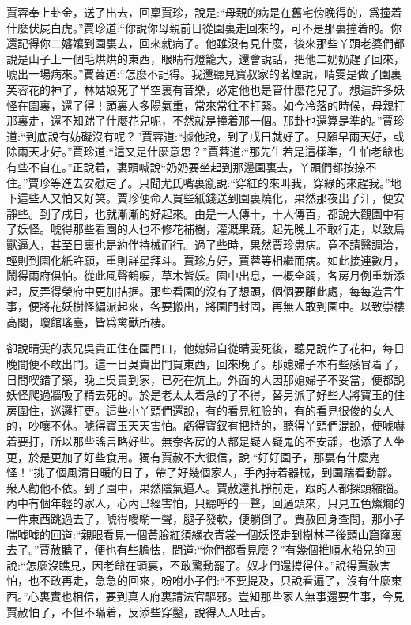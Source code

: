 \begin{parag}
    賈蓉奉上卦金，送了出去，回稟賈珍，說是:“母親的病是在舊宅傍晚得的，爲撞着什麼伏屍白虎。”賈珍道:“你說你母親前日從園裏走回來的，可不是那裏撞着的。你還記得你二嬸孃到園裏去，回來就病了。他雖沒有見什麼，後來那些丫頭老婆們都說是山子上一個毛烘烘的東西，眼睛有燈籠大，還會說話，把他二奶奶趕了回來，唬出一場病來。”賈蓉道:“怎麼不記得。我還聽見寶叔家的茗煙說，晴雯是做了園裏芙蓉花的神了，林姑娘死了半空裏有音樂，必定他也是管什麼花兒了。想這許多妖怪在園裏，還了得！頭裏人多陽氣重，常來常往不打緊。如今冷落的時候，母親打那裏走，還不知踹了什麼花兒呢，不然就是撞着那一個。那卦也還算是準的。”賈珍道:“到底說有妨礙沒有呢？”賈蓉道:“據他說，到了戌日就好了。只願早兩天好，或除兩天才好。”賈珍道:“這又是什麼意思？”賈蓉道:“那先生若是這樣準，生怕老爺也有些不自在。”正說着，裏頭喊說“奶奶要坐起到那邊園裏去，丫頭們都按捺不住。”賈珍等進去安慰定了。只聞尤氏嘴裏亂說:“穿紅的來叫我，穿綠的來趕我。”地下這些人又怕又好笑。賈珍便命人買些紙錢送到園裏燒化，果然那夜出了汗，便安靜些。到了戌日，也就漸漸的好起來。由是一人傳十，十人傳百，都說大觀園中有了妖怪。唬得那些看園的人也不修花補樹，灌溉果蔬。起先晚上不敢行走，以致鳥獸逼人，甚至日裏也是約伴持械而行。過了些時，果然賈珍患病。竟不請醫調治，輕則到園化紙許願，重則詳星拜斗。賈珍方好，賈蓉等相繼而病。如此接連數月，鬧得兩府俱怕。從此風聲鶴唳，草木皆妖。園中出息，一概全蠲，各房月例重新添起，反弄得榮府中更加拮据。那些看園的沒有了想頭，個個要離此處，每每造言生事，便將花妖樹怪編派起來，各要搬出，將園門封固，再無人敢到園中。以致崇樓高閣，瓊館瑤臺，皆爲禽獸所棲。
\end{parag}


\begin{parag}
    卻說晴雯的表兄吳貴正住在園門口，他媳婦自從晴雯死後，聽見說作了花神，每日晚間便不敢出門。這一日吳貴出門買東西，回來晚了。那媳婦子本有些感冒着了，日間喫錯了藥，晚上吳貴到家，已死在炕上。外面的人因那媳婦子不妥當，便都說妖怪爬過牆吸了精去死的。於是老太太着急的了不得，替另派了好些人將寶玉的住房圍住，巡邏打更。這些小丫頭們還說，有的看見紅臉的，有的看見很俊的女人的，吵嚷不休。唬得寶玉天天害怕。虧得寶釵有把持的，聽得丫頭們混說，便唬嚇着要打，所以那些謠言略好些。無奈各房的人都是疑人疑鬼的不安靜，也添了人坐更，於是更加了好些食用。獨有賈赦不大很信，說:“好好園子，那裏有什麼鬼怪！”挑了個風清日暖的日子，帶了好幾個家人，手內持着器械，到園踹看動靜。衆人勸他不依。到了園中，果然陰氣逼人。賈赦還扎掙前走，跟的人都探頭縮腦。內中有個年輕的家人，心內已經害怕，只聽呼的一聲，回過頭來，只見五色燦爛的一件東西跳過去了，唬得噯喲一聲，腿子發軟，便躺倒了。賈赦回身查問，那小子喘噓噓的回道:“親眼看見一個黃臉紅須綠衣青裳一個妖怪走到樹林子後頭山窟窿裏去了。”賈赦聽了，便也有些膽怯，問道:“你們都看見麼？”有幾個推順水船兒的回說:“怎麼沒瞧見，因老爺在頭裏，不敢驚動罷了。奴才們還撐得住。”說得賈赦害怕，也不敢再走，急急的回來，吩咐小子們:“不要提及，只說看遍了，沒有什麼東西。”心裏實也相信，要到真人府裏請法官驅邪。豈知那些家人無事還要生事，今見賈赦怕了，不但不瞞着，反添些穿鑿，說得人人吐舌。
\end{parag}


